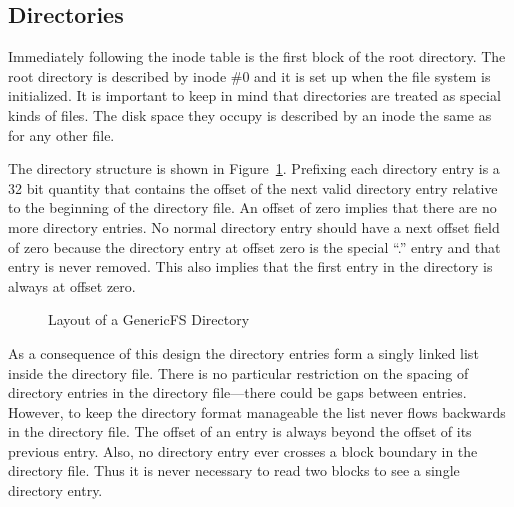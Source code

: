 \subsection{Directories}
\label{sec:structure-directories}

Immediately following the inode table is the first block of the root directory. The root
directory is described by inode \#0 and it is set up when the file system is initialized. It is
important to keep in mind that directories are treated as special kinds of files. The disk space
they occupy is described by an inode the same as for any other file.

The directory structure is shown in Figure~\ref{fig:directory-layout}. Prefixing each directory
entry is a 32 bit quantity that contains the offset of the next valid directory entry relative
to the beginning of the directory file. An offset of zero implies that there are no more
directory entries. No normal directory entry should have a next offset field of zero because the
directory entry at offset zero is the special ``.'' entry and that entry is never removed. This
also implies that the first entry in the directory is always at offset zero.

\begin{figure}[tbhp]
  \center
  \caption{Layout of a GenericFS Directory}
  \label{fig:directory-layout}
\end{figure}

As a consequence of this design the directory entries form a singly linked list inside the
directory file. There is no particular restriction on the spacing of directory entries in the
directory file---there could be gaps between entries. However, to keep the directory format
manageable the list never flows backwards in the directory file. The offset of an entry is
always beyond the offset of its previous entry. Also, no directory entry ever crosses a block
boundary in the directory file. Thus it is never necessary to read two blocks to see a single
directory entry.

